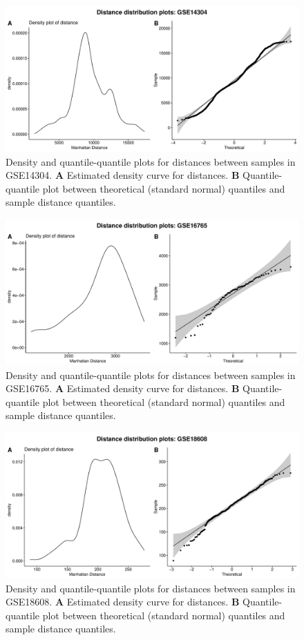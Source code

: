 \documentclass[10pt,letterpaper]{article}\usepackage[]{graphicx}\usepackage[]{color}
\begin{document}
\begin{figure}[H]
	\includegraphics[width=\textwidth]{manhattan-distance_hist_GSE14304.pdf}
	\caption{Density and quantile-quantile plots for distances between samples in GSE14304. \textbf{A} Estimated density curve for distances. \textbf{B} Quantile-quantile plot between theoretical (standard normal) quantiles and sample distance quantiles.}
\end{figure}

\begin{figure}[H]
	\includegraphics[width=\textwidth]{manhattan-distance_hist_GSE16765.pdf}
	\caption{Density and quantile-quantile plots for distances between samples in GSE16765. \textbf{A} Estimated density curve for distances. \textbf{B} Quantile-quantile plot between theoretical (standard normal) quantiles and sample distance quantiles.}
\end{figure}

\begin{figure}[H]
	\includegraphics[width=\textwidth]{manhattan-distance_hist_GSE18608.pdf}
	\caption{Density and quantile-quantile plots for distances between samples in GSE18608. \textbf{A} Estimated density curve for distances. \textbf{B} Quantile-quantile plot between theoretical (standard normal) quantiles and sample distance quantiles.}
\end{figure}
\end{document}
